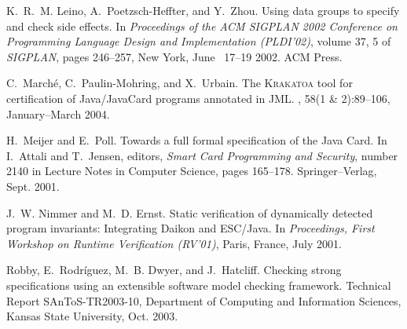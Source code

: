 \documentclass{llncs}
\begin{document}
\begin{thebibliography}{10}
K.~R.~M. Leino, A.~Poetzsch-Heffter, and Y.~Zhou.
\newblock Using data groups to specify and check side effects.
\newblock In {\em Proceedings of the {ACM} {SIGPLAN} 2002 Conference on
  Programming Language Design and Implementation ({PLDI}'02)}, volume 37, 5 of
  {\em SIGPLAN}, pages 246--257, New York, June ~17--19 2002. ACM Press.

C.~March{\'e}, C.~Paulin-Mohring, and X.~Urbain.
\newblock The \textsc{Krakatoa} tool for certification of {Java/JavaCard}
  programs annotated in {JML}.
, 58(1 \& 2):89--106,
  January--March 2004.

H.~Meijer and E.~Poll.
\newblock Towards a full formal specification of the {Java Card}.
\newblock In I.~Attali and T.~Jensen, editors, {\em Smart Card Programming and
  Security}, number 2140 in Lecture Notes in Computer Science, pages 165--178.
  Springer--Verlag, Sept. 2001.

J.~W. Nimmer and M.~D. Ernst.
\newblock Static verification of dynamically detected program invariants:
  Integrating {Daikon} and {ESC/Java}.
\newblock In {\em Proceedings, First Workshop on Runtime Verification (RV'01)},
  Paris, France, July 2001.

Robby, E.~Rodr\'{i}guez, M.~B. Dwyer, and J.~Hatcliff.
\newblock Checking strong specifications using an extensible software model
  checking framework.
\newblock Technical Report {SAnToS-TR2003-10}, Department of Computing and Information Sciences,
  Kansas State University, Oct. 2003.

\end{thebibliography}


%
%


\appendix
\end{document}

